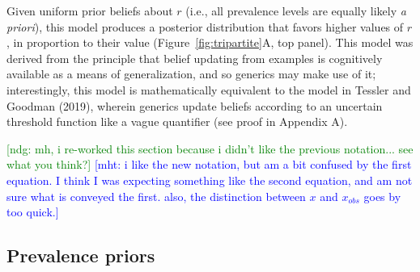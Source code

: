 \documentclass[floatsintext,doc]{apa6}
\newcommand{\mht}[1]{{\textcolor{Blue}{[mht: #1]}}}
\newcommand{\ndg}[1]{{\textcolor{Green}{[ndg: #1]}}}
\begin{document}
Given uniform prior beliefs about $r$ (i.e., all prevalence levels are equally likely \emph{a priori}), this model produces a posterior distribution that favors higher values of $r$, in proportion to their value (Figure~\ref{fig:tripartite}A, top panel). 
This model was derived from the principle that belief updating from examples is cognitively available as a means of generalization, and so generics may make use of it; interestingly, this model is mathematically equivalent to the model in Tessler and Goodman (2019), wherein generics update beliefs according to an uncertain threshold function like a vague quantifier (see proof in Appendix A). 

\ndg{mh, i re-worked this section because i didn't like the previous notation... see what you think?}
\mht{i like the new notation, but am a bit confused by the first equation. I think I was expecting something like the second equation, and am not sure what is conveyed the first. also, the distinction between $x$ and $x_{obs}$ goes by too quick.}
\subsection{Prevalence priors}
\end{document}

